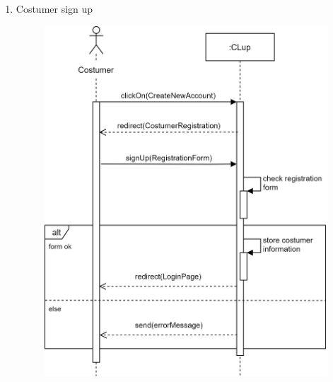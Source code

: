 \documentclass[]{article}
\begin{document}
\begin{enumerate}
						\item Costumer sign up
						\begin{figure}[H]
							\centering
							\includegraphics[scale=1.1]{signup.png}
							\caption{}
							\label{fig:signup_sequencediagramm}
						\end{figure}
						\newpage
						

\end{enumerate}
\end{document}
